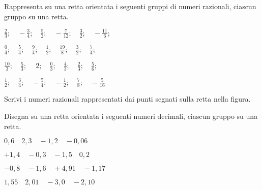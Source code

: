 \subsubsection*{}

\begin{esercizio}
 \label{ese:3.26}
Rappresenta su una retta orientata i seguenti gruppi di numeri razionali, 
ciascun gruppo su una retta.

\begin{htmulticols}{2}
\begin{enumeratees}
\spazielenx
 \item 
\(\displaystyle{\frac{2}{3};\quad-\frac{3}{4};\quad\frac{5}{2};\quad
-\frac{7}{12};\quad\frac{3}{2};\quad -\frac{11}{6};
}
\)
 \item 
\(\displaystyle{\frac{0}{4};\quad\frac{5}{4};\quad\frac{9}{4};\quad
\frac{1}{2};\quad\frac{19}{8};\quad\frac{3}{2};\quad\frac{7}{4};
}
\)
 \item 
\(\displaystyle{\frac{10}{3};\quad\frac{5}{3};\quad~2;\quad
\frac{0}{3};\quad\frac{4}{3};\quad\frac{2}{3};\quad\frac{5}{6};
}
\)
 \item 
\(\displaystyle{\frac{1}{2};\quad\frac{3}{4};\quad-\frac{5}{4};
\quad-\frac{1}{2};\quad\frac{7}{8};\quad -\frac{5}{16}}
\)
 \end{enumeratees}
\end{htmulticols}
\end{esercizio}

\begin{esercizio}
 \label{ese:3.27}
 Scrivi i numeri razionali rappresentati dai punti segnati sulla retta nella 
 figura.
\begin{center}
\end{center}
\end{esercizio}

\begin{esercizio}
 \label{ese:3.28}
Disegna su una retta orientata i seguenti numeri decimali, ciascun gruppo su 
una retta.

\begin{htmulticols}{2}
\begin{enumeratees}
 \item \(0,6\quad2,3\quad-1,2\quad-0,06\)
 \item \(+1,4\quad-0,3\quad-1,5\quad0,2\)
 \item \(-0,8\quad-1,6\quad+4,91\quad-1,17\)
 \item \(1,55\quad2,01\quad-3,0\quad-2,10\)
\end{enumeratees}
\end{htmulticols}
\end{esercizio}

